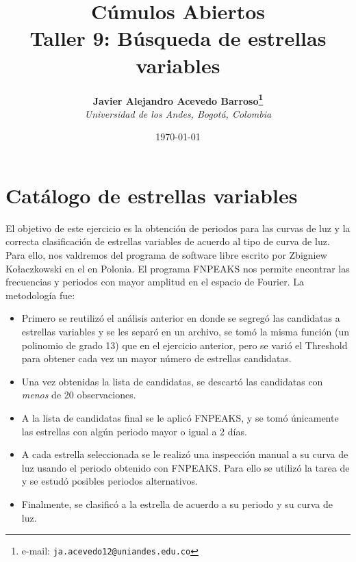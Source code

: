\documentclass[12pt]{article}
\begin{document}
\title{Cúmulos Abiertos \\ Taller 9: Búsqueda de estrellas variables}

\author{
\textbf{Javier Alejandro Acevedo Barroso\thanks{e-mail: \texttt{ja.acevedo12@uniandes.edu.co}}}\\
\textit{Universidad de los Andes, Bogotá, Colombia}\\
 }%

\date{\today}
\maketitle %


\normalsize
\newpage




\section{Catálogo de estrellas variables}
El objetivo de este ejercicio es la obtención de periodos para las curvas de luz y la correcta clasificación de estrellas variables de acuerdo al tipo de curva de luz. Para ello, nos valdremos del programa de software libre  escrito por Zbigniew Kołaczkowski en el  en Polonia. El programa FNPEAKS nos permite encontrar las frecuencias y periodos con mayor amplitud en el espacio de Fourier.
La metodología fue:
\begin{itemize}
\item Primero se reutilizó el análisis anterior en donde se segregó las candidatas a estrellas variables y se les separó en un archivo, se tomó la misma función (un polinomio de grado 13) que en el ejercicio anterior, pero se varió el Threshold para obtener cada vez un mayor número de estrellas candidatas.
\item Una vez obtenidas la lista de candidatas, se descartó las candidatas con \emph{menos} de 20 observaciones.
\item A la lista de candidatas final se le aplicó FNPEAKS, y se tomó únicamente las estrellas con algún periodo mayor o igual a 2 días.
\item A cada estrella seleccionada se le realizó una inspección manual a su curva de luz usando el periodo obtenido con FNPEAKS. Para ello se utilizó la tarea  de  y se estudó posibles periodos alternativos.
\item Finalmente, se clasificó a la estrella de acuerdo a su periodo y su curva de luz.
\end{itemize}
\end{document}
